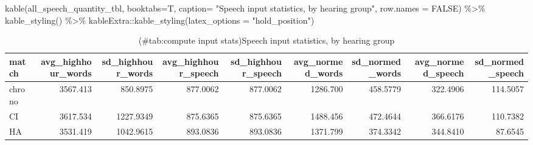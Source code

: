 \documentclass[
]{article}
\newenvironment{Shaded}{\begin{snugshade}}{\end{snugshade}}
\newcommand{\AttributeTok}[1]{\textcolor[rgb]{0.77,0.63,0.00}{#1}}
\newcommand{\ConstantTok}[1]{\textcolor[rgb]{0.00,0.00,0.00}{#1}}
\newcommand{\FunctionTok}[1]{\textcolor[rgb]{0.00,0.00,0.00}{#1}}
\newcommand{\NormalTok}[1]{#1}
\newcommand{\SpecialCharTok}[1]{\textcolor[rgb]{0.00,0.00,0.00}{#1}}
\newcommand{\StringTok}[1]{\textcolor[rgb]{0.31,0.60,0.02}{#1}}
\begin{document}
\begin{Shaded}
\begin{Highlighting}[]
\FunctionTok{kable}\NormalTok{(all\_speech\_quantity\_tbl, }\AttributeTok{booktabs=}\NormalTok{T, }
              \AttributeTok{caption=} \StringTok{"Speech input statistics, by hearing group"}\NormalTok{,}
             \AttributeTok{row.names =} \ConstantTok{FALSE}\NormalTok{) }\SpecialCharTok{\%\textgreater{}\%} 
  \FunctionTok{kable\_styling}\NormalTok{() }\SpecialCharTok{\%\textgreater{}\%}
\NormalTok{  kableExtra}\SpecialCharTok{::}\FunctionTok{kable\_styling}\NormalTok{(}\AttributeTok{latex\_options =} \StringTok{"hold\_position"}\NormalTok{)}
\end{Highlighting}
\end{Shaded}

\begin{table}[!h]

\caption{(\#tab:compute input stats)Speech input statistics, by hearing group}
\centering
\begin{tabular}[t]{lrrrrrrrr}
\toprule
match & avg\_highhour\_words & sd\_highhour\_words & avg\_highhour\_speech & sd\_highhour\_speech & avg\_normed\_words & sd\_normed\_words & avg\_normed\_speech & sd\_normed\_speech\\
\midrule
chrono & 3567.413 & 850.8975 & 877.0062 & 877.0062 & 1286.700 & 458.5779 & 322.4906 & 114.5057\\
CI & 3617.534 & 1227.9349 & 875.6365 & 875.6365 & 1488.456 & 472.4644 & 366.6176 & 110.7382\\
HA & 3531.419 & 1042.9615 & 893.0836 & 893.0836 & 1371.799 & 374.3342 & 344.8410 & 87.6545\\
\bottomrule
\end{tabular}
\end{table}
\end{document}
